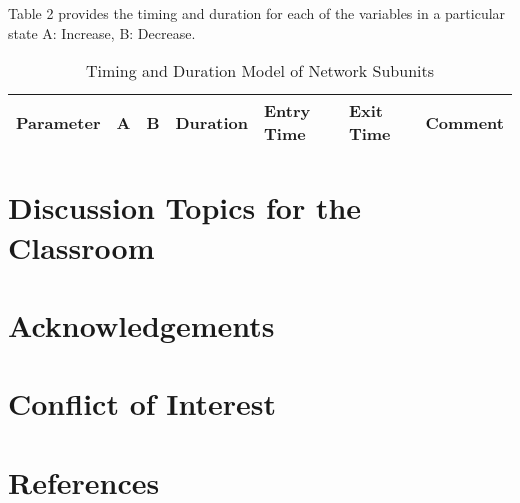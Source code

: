 \documentclass[preprint, 8pt]{elsarticle}
\theoremstyle{definition}
\begin{document}
Table 2 provides the timing and duration for each of the variables in a particular state A: Increase, B: Decrease.  

\begin{enumerate}
\end{enumerate}

\begin{table}[H]\tiny
  \caption{Timing and Duration Model of Network Subunits}
\begin{tabular}{rllp{1.25cm}lll}
		\hline	
		Parameter & A & B & Duration & Entry Time &  Exit Time & Comment \\
		 \hline 
		\hline
\end{tabular}
\end{table}


\section{Discussion Topics for the Classroom}



\section{Acknowledgements}


\section{Conflict of Interest}

\section{References}
\end{document}
